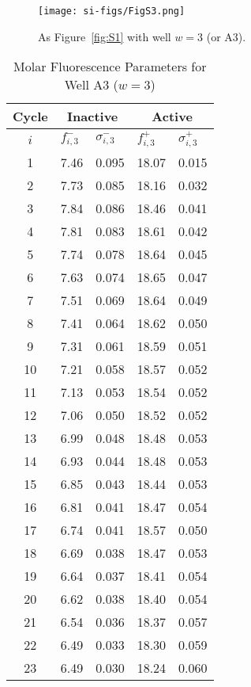                 \begin{figure}
                    \centering
                    \texttt{[image: si-figs/FigS3.png]}
                    \caption{
                        As Figure~\ref{fig:S1} with well $w=3$ (or A3).
                    }
                \end{figure}
                \clearpage
    \begin{table}
        \caption{Molar Fluorescence Parameters for Well A3 ($w=3$)}
        \centering
        \begin{tabular}{c|ll|ll}
            Cycle & \multicolumn{2}{c|}{Inactive} & \multicolumn{2}{c}{Active} \\
            \hline
            $i$ & $f_{i,3}^{-}$ & $\sigma_{i,3}^{-}$ &  $f_{i,3}^{+}$ & $\sigma_{i,3}^{+}$ \\
            \hline
    1 & 7.46 & 0.095 & 18.07 & 0.015 \\
2 & 7.73 & 0.085 & 18.16 & 0.032 \\
3 & 7.84 & 0.086 & 18.46 & 0.041 \\
4 & 7.81 & 0.083 & 18.61 & 0.042 \\
5 & 7.74 & 0.078 & 18.64 & 0.045 \\
6 & 7.63 & 0.074 & 18.65 & 0.047 \\
7 & 7.51 & 0.069 & 18.64 & 0.049 \\
8 & 7.41 & 0.064 & 18.62 & 0.050 \\
9 & 7.31 & 0.061 & 18.59 & 0.051 \\
10 & 7.21 & 0.058 & 18.57 & 0.052 \\
11 & 7.13 & 0.053 & 18.54 & 0.052 \\
12 & 7.06 & 0.050 & 18.52 & 0.052 \\
13 & 6.99 & 0.048 & 18.48 & 0.053 \\
14 & 6.93 & 0.044 & 18.48 & 0.053 \\
15 & 6.85 & 0.043 & 18.44 & 0.053 \\
16 & 6.81 & 0.041 & 18.47 & 0.054 \\
17 & 6.74 & 0.041 & 18.57 & 0.050 \\
18 & 6.69 & 0.038 & 18.47 & 0.053 \\
19 & 6.64 & 0.037 & 18.41 & 0.054 \\
20 & 6.62 & 0.038 & 18.40 & 0.054 \\
21 & 6.54 & 0.036 & 18.37 & 0.057 \\
22 & 6.49 & 0.033 & 18.30 & 0.059 \\
23 & 6.49 & 0.030 & 18.24 & 0.060 \\

\end{tabular}
\end{table}
